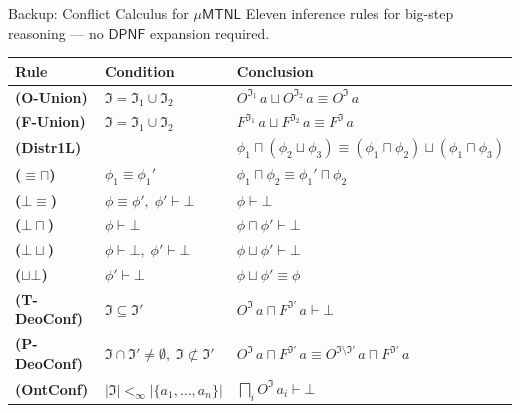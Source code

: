 \documentclass[9pt,aspectratio=169]{beamer}
\newcommand{\logic}[1]{\ensuremath{\mathsf{#1}}\xspace}
\newcommand{\TDDLfm}{\logic{\mu MTNL}}
\newcommand{\is}{\ensuremath{\mathfrak{I}}}
\newcommand{\dpnf}{\ensuremath{\mathsf{DPNF}}}
\newcommand{\ob}[2]{\ensuremath{O^{#1}\,#2}}
\newcommand{\forbb}[2]{\ensuremath{F^{#1}\,#2}}
\begin{document}
\begin{frame}{Backup: Conflict Calculus for $\TDDLfm$}
\small
Eleven inference rules for big-step reasoning — no $\dpnf$ expansion required.

\vspace{2mm}
\begin{center}
\footnotesize
\renewcommand{\arraystretch}{1.35}
\begin{tabular}{|l|l|l|}
\hline
\textbf{Rule} & \textbf{Condition} & \textbf{Conclusion} \\\hline
\textbf{(O-Union)} & $\is = \is_1 \cup \is_2$ & $\ob{\is_1}{a} \sqcup \ob{\is_2}{a} \equiv \ob{\is}{a}$ \\\hline
\textbf{(F-Union)} & $\is = \is_1 \cup \is_2$ & $\forbb{\is_1}{a} \sqcup \forbb{\is_2}{a} \equiv \forbb{\is}{a}$ \\\hline
\textbf{(Distr1L)} & & $\phi_1 \sqcap (\phi_2 \sqcup \phi_3) \equiv (\phi_1 \sqcap \phi_2) \sqcup (\phi_1 \sqcap \phi_3)$ \\\hline
\textbf{($\bm{\equiv\sqcap}$)} & $\phi_1 \equiv \phi_1'$ & $\phi_1 \sqcap \phi_2 \equiv \phi_1' \sqcap \phi_2$ \\\hline
\textbf{($\bm{\bot\equiv}$)} & $\phi \equiv \phi',\; \phi' \vdash \bot$ & $\phi \vdash \bot$ \\\hline
\textbf{($\bm{\bot\sqcap}$)} & $\phi \vdash \bot$ & $\phi \sqcap \phi' \vdash \bot$ \\\hline
\textbf{($\bm{\bot\sqcup}$)} & $\phi \vdash \bot,\; \phi' \vdash \bot$ & $\phi \sqcup \phi' \vdash \bot$ \\\hline
\textbf{($\bm{\sqcup\bot}$)} & $\phi' \vdash \bot$ & $\phi \sqcup \phi' \equiv \phi$ \\\hline
\textbf{(T-DeoConf)} & $\is \subseteq \is'$ & $\ob{\is}{a} \sqcap \forbb{\is'}{a} \vdash \bot$ \\\hline
\textbf{(P-DeoConf)} & $\is \cap \is' \neq \emptyset,\; \is \not\subset \is'$ & $\ob{\is}{a} \sqcap \forbb{\is'}{a} \equiv \ob{\is \!\setminus\! \is'}{a} \sqcap \forbb{\is'}{a}$ \\\hline
\textbf{(OntConf)} & $|\is| <_\infty |\{a_1,\dots,a_n\}|$ & $\bigsqcap_{i} \ob{\is}{a_i} \vdash \bot$ \\\hline
\end{tabular}
\end{center}


\end{frame}
\end{document}

